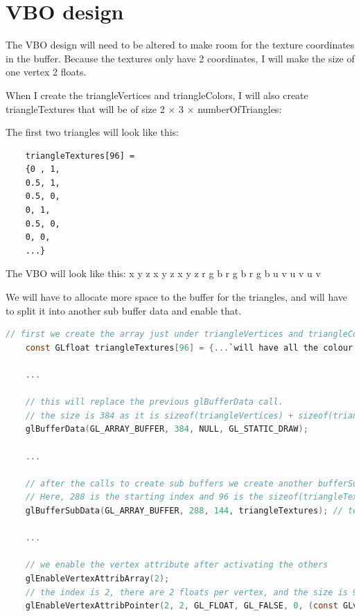 \documentclass[10pt]{report}
\begin{document}
\section{VBO design}
The VBO design will need to be altered to make room for the texture coordinates in the buffer. Because the textures only have 2 coordinates, I will make the size of one vertex 2 floats.

When I create the triangleVertices and triangleColors, I will also create triangleTextures that will be of size 2 $\times$ 3 $\times$ numberOfTriangles: 

The first two triangles will look like this:
\begin{verbatim}
    triangleTextures[96] = 
    {0 , 1,
    0.5, 1,
    0.5, 0,
    0, 1,
    0.5, 0,
    0, 0,
    ...}
\end{verbatim}

The VBO will look like this: x y z x y z x y z r g b r g b r g b u v u v u v 

We will have to allocate more space to the buffer for the triangles, and will have to split it into another sub buffer data and enable that.

\begin{lstlisting}[language=c]
    // first we create the array just under triangleVertices and triangleColours
    const GLfloat triangleTextures[96] = {...`will have all the colour data here as floats`...}

    ...

    // this will replace the previous glBufferData call.
    // the size is 384 as it is sizeof(triangleVertices) + sizeof(triangleColors) + sizeof(triangleTextures)
    glBufferData(GL_ARRAY_BUFFER, 384, NULL, GL_STATIC_DRAW);

    ...

    // after the calls to create sub buffers we create another bufferSubData for the textures
    // Here, 288 is the starting index and 96 is the sizeof(triangleTextures) 
    glBufferSubData(GL_ARRAY_BUFFER, 288, 144, triangleTextures); // textures

    ...

    // we enable the vertex attribute after activating the others
    glEnableVertexAttribArray(2);
    // the index is 2, there are 2 floats per vertex, and the size is 96
    glEnableVertexAttribPointer(2, 2, GL_FLOAT, GL_FALSE, 0, (const GLvoid*) 96);

\end{lstlisting}
\end{document}
